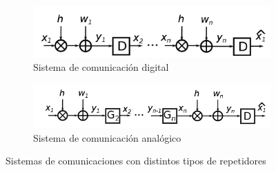 			\begin{figure}[H]
				\centering
				\begin{subfigure}[b]{0.7\textwidth}
					\includegraphics[width=\textwidth]{./Figuras/Sistema_digital}
					\caption{Sistema de comunicación digital}
					\label{Fig.Sist_dig}
				\end{subfigure}
			\begin{subfigure}[b]{0.7\textwidth}
				\includegraphics[width=\textwidth]{./Figuras/Sistema_analogico}
				\caption{Sistema de comunicación analógico}
				\label{Fig.Sist_ana}
			\end{subfigure}
			\caption{Sistemas de comunicaciones con distintos tipos de repetidores}
		\end{figure}